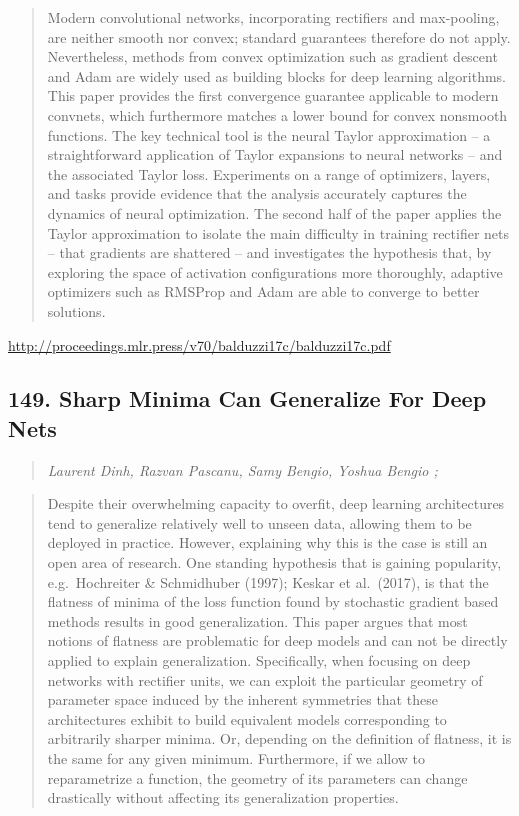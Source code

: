 \documentclass{article}
\begin{document}
\begin{quote}
    Modern convolutional networks, incorporating rectifiers and max-pooling, are neither smooth nor convex; standard guarantees therefore do not apply. Nevertheless, methods from convex optimization such as gradient descent and Adam are widely used as building blocks for deep learning algorithms. This paper provides the first convergence guarantee applicable to modern convnets, which furthermore matches a lower bound for convex nonsmooth functions. The key technical tool is the neural Taylor approximation – a straightforward application of Taylor expansions to neural networks – and the associated Taylor loss. Experiments on a range of optimizers, layers, and tasks provide evidence that the analysis accurately captures the dynamics of neural optimization. The second half of the paper applies the Taylor approximation to isolate the main difficulty in training rectifier nets – that gradients are shattered – and investigates the hypothesis that, by exploring the space of activation configurations more thoroughly, adaptive optimizers such as RMSProp and Adam are able to converge to better solutions.  
\end{quote}

\href{http://proceedings.mlr.press/v70/balduzzi17c/balduzzi17c.pdf}{http://proceedings.mlr.press/v70/balduzzi17c/balduzzi17c.pdf}

\subsection{149. Sharp Minima Can Generalize For Deep Nets}

\begin{quote}
\footnotesize{\textit{Laurent Dinh, Razvan Pascanu, Samy Bengio, Yoshua Bengio ;}}

\end{quote}

\begin{quote}
    Despite their overwhelming capacity to overfit, deep learning architectures tend to generalize relatively well to unseen data, allowing them to be deployed in practice. However, explaining why this is the case is still an open area of research. One standing hypothesis that is gaining popularity, e.g.\ Hochreiter \& Schmidhuber (1997); Keskar et al.\ (2017), is that the flatness of minima of the loss function found by stochastic gradient based methods results in good generalization. This paper argues that most notions of flatness are problematic for deep models and can not be directly applied to explain generalization. Specifically, when focusing on deep networks with rectifier units, we can exploit the particular geometry of parameter space induced by the inherent symmetries that these architectures exhibit to build equivalent models corresponding to arbitrarily sharper minima. Or, depending on the definition of flatness, it is the same for any given minimum. Furthermore, if we allow to reparametrize a function, the geometry of its parameters can change drastically without affecting its generalization properties.  
\end{quote}
\end{document}
